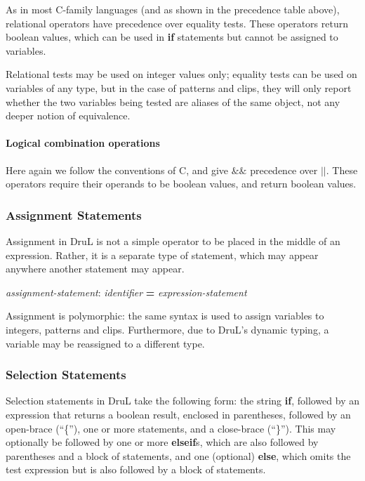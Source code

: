 As in most C-family languages (and as shown in the precedence table above), relational operators have precedence over equality tests.  These operators return boolean values, which can be used in \textbf{if} statements but cannot be assigned to variables.

Relational tests may be used on integer values only; equality tests can be used on variables of any type, but in the case of patterns and clips, they will only report whether the two variables being tested are  aliases of the same object, not any deeper notion of equivalence.

\paragraph{Logical combination operations}

Here again we follow the conventions of C, and give $\&\&$ precedence over $||$.  These operators require their operands to be boolean values, and return boolean values.

\subsubsection{Assignment Statements}

Assignment in DruL is not a simple operator to be placed in the middle of an expression.  Rather, it is a separate type of statement, which may appear anywhere another statement may appear.  

\begin{center}
\emph{assignment-statement}: \emph{identifier} \textbf{=}  \emph{expression-statement}
\end{center}

Assignment is polymorphic: the same syntax is used to assign variables to
integers, patterns and clips. Furthermore, due to DruL's dynamic typing,
a variable may be reassigned to a different type.

\subsubsection{Selection Statements}

Selection statements in DruL take the following form: the string \textbf{if}, followed by an expression that returns a boolean result, enclosed in parentheses, followed by an open-brace (``\{''), one or more statements, and a close-brace (``\}'').  This may optionally be followed by one or more \textbf{elseif}s, which are also followed by parentheses and a block of statements, and one (optional) \textbf{else}, which omits the test expression but is also followed by a block of statements.

